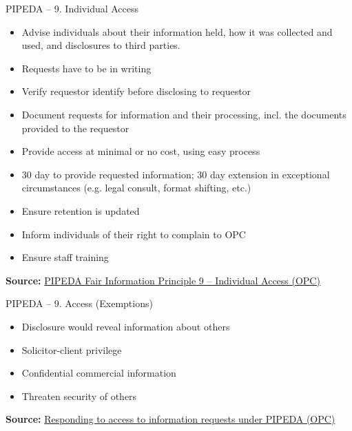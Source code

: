 \documentclass[ignorenonframetext,xcolor=x11names]{beamer}
\begin{document}
\begin{frame}{PIPEDA -- 9. Individual Access}
\begin{itemize}
   \item Advise individuals about their information held, how it was collected and used, and disclosures to third parties. 
   \item Requests have to be in writing
   \item Verify requestor identify before disclosing to requestor
   \item Document requests for information and their processing, incl. the documents provided to the requestor
   \item Provide access at minimal or no cost, using easy process
   \item 30 day to provide requested information; 30 day extension in exceptional circumstances (e.g. legal consult, format shifting, etc.)
   \item Ensure retention is updated
   \item Inform individuals of their right to complain to OPC
   \item Ensure staff training
\end{itemize}

\vspace{\baselineskip}
\scriptsize \textbf{Source:} \href{https://www.priv.gc.ca/en/privacy-topics/privacy-laws-in-canada/the-personal-information-protection-and-electronic-documents-act-pipeda/p_principle/principles/p_access/}{PIPEDA Fair Information Principle 9 -- Individual Access (OPC)}
\end{frame}

\begin{frame}{PIPEDA -- 9. Access \small (Exemptions)}
\begin{itemize}
   \item Disclosure would reveal information about others
   \item Solicitor-client privilege
   \item Confidential commercial information
   \item Threaten security of others
\end{itemize}

\vspace{\baselineskip}
\scriptsize \textbf{Source:} \href{https://www.priv.gc.ca/en/privacy-topics/accessing-personal-information/obligations-for-organizations/02_05_d_54_ati_02/}{Responding to access to information requests under PIPEDA (OPC)}
\end{frame}
\end{document}
